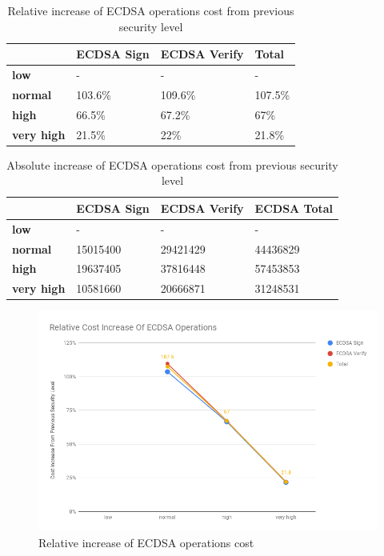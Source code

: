 \documentclass{llncs}
\begin{document}
\begin{table}[]
  \begin{tabular}{|l|l|l|l|}
    \hline
  & \textbf{ECDSA Sign} & \textbf{ECDSA Verify} & \textbf{Total} \\ \hline
  \textbf{low}       & -                 & -                   & -              \\ \hline
  \textbf{normal}    & 103.6\%           & 109.6\%             & 107.5\%        \\ \hline
  \textbf{high}      & 66.5\%            & 67.2\%              & 67\%           \\ \hline
  \textbf{very high} & 21.5\%            & 22\%                & 21.8\%         \\ \hline
  \end{tabular}
  \centering \caption{\label{table:ecdsa-relative-cost-increase} Relative increase of ECDSA operations cost from previous security level}
  \end{table}

\begin{table}[]
\begin{tabular}{|l|l|l|l|}
\hline
                   & \textbf{ECDSA Sign} & \textbf{ECDSA Verify} & \textbf{ECDSA Total} \\ \hline
\textbf{low}       & -                   & -                     & -                    \\ \hline
\textbf{normal}    & 15015400            & 29421429              & 44436829             \\ \hline
\textbf{high}      & 19637405            & 37816448              & 57453853             \\ \hline
\textbf{very high} & 10581660            & 20666871              & 31248531             \\ \hline
\end{tabular}
\centering \caption{\label{table:ecdsa-absolute-cost-increase} Absolute increase of ECDSA operations cost from previous security level}
\end{table}

\begin{figure}
  \centering
  \includegraphics[width=1.0\textwidth]{img/ecdsa_realtive_cost_increase.png}
  \centering \caption{\label{fig:ecdsa-relative-cost-incerase} Relative increase of ECDSA operations cost}
\end{figure}
\end{document}
